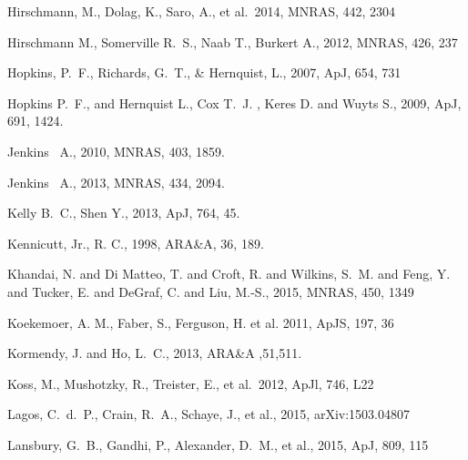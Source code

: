 \documentclass[a4paper,fleqn,usenatbib,letter]{mnras}
\begin{document}
\begin{thebibliography}{99}
Hirschmann, M., Dolag, K., Saro, A., et al.\ 2014, MNRAS, 442, 2304 


{Hirschmann} M.,  {Somerville} R.~S.,  {Naab} T.,    {Burkert} A.,  2012,
  MNRAS, 426, 237



Hopkins, P.~F.,  Richards, G.~T., \& Hernquist, L., 2007, ApJ, 654, 731 

{Hopkins} P.~F., and {Hernquist} L.,  {Cox} T.~J. , {Keres} D. and 
{Wuyts} S., 2009, ApJ, 691, 1424.


Jenkins ~A., 2010, MNRAS, 403, 1859.

Jenkins ~A., 2013, MNRAS, 434, 2094.



Kelly B.~C.,  Shen Y.,  2013, ApJ, 764, 45.




Kennicutt, Jr., R. C., 1998, ARA\&A, 36, 189.

Khandai, N. and Di Matteo, T. and Croft, R. and Wilkins, S.~M. and 
	Feng, Y. and Tucker, E. and DeGraf, C. and Liu, M.-S., 2015,
MNRAS, 450, 1349 

Koekemoer, A. M., Faber, S., Ferguson, H. et al. 2011, ApJS, 197, 36



Kormendy, J. and Ho, L.~C., 2013, ARA\&A ,51,511.

Koss, M., Mushotzky, R., Treister, E., et al.\ 2012, ApJl, 746, L22 

Lagos, C.~d.~P., Crain, R.~A., Schaye, J., et al., 2015, arXiv:1503.04807

Lansbury, G.~B., Gandhi, P., Alexander, D.~M., et al., 2015, ApJ, 809, 115 


\end{thebibliography}
\end{document}
